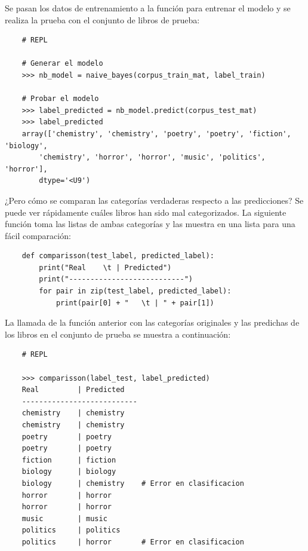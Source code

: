 Se pasan los datos de entrenamiento a la función  para entrenar el modelo y se realiza la prueba con el conjunto de libros de prueba:
\begin{verbatim}
    # REPL
    
    # Generar el modelo
    >>> nb_model = naive_bayes(corpus_train_mat, label_train)

    # Probar el modelo
    >>> label_predicted = nb_model.predict(corpus_test_mat)
    >>> label_predicted
    array(['chemistry', 'chemistry', 'poetry', 'poetry', 'fiction', 'biology',
        'chemistry', 'horror', 'horror', 'music', 'politics', 'horror'],
        dtype='<U9')
\end{verbatim}

¿Pero cómo se comparan las categorías verdaderas respecto a las predicciones? Se puede ver rápidamente cuáles libros han sido mal categorizados. La siguiente función toma las listas de ambas categorías y las muestra en una lista para una fácil comparación:
\begin{verbatim}
    def comparisson(test_label, predicted_label):
        print("Real    \t | Predicted")
        print("---------------------------")
        for pair in zip(test_label, predicted_label):
            print(pair[0] + "   \t | " + pair[1])
\end{verbatim}

La llamada de la función anterior  con las categorías originales y las predichas de los libros en el conjunto de prueba se muestra a continuación:
\begin{verbatim}
    # REPL

    >>> comparisson(label_test, label_predicted)
    Real         | Predicted
    ---------------------------
    chemistry    | chemistry
    chemistry    | chemistry
    poetry       | poetry
    poetry       | poetry
    fiction      | fiction
    biology      | biology
    biology      | chemistry    # Error en clasificacion
    horror       | horror
    horror       | horror
    music        | music
    politics     | politics
    politics     | horror       # Error en clasificacion
\end{verbatim}

